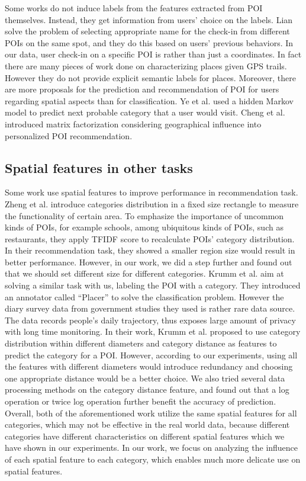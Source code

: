 Some works\cite{Kim:2011:EUF:2030112.2030142,placer1} do not induce 
labels from the features extracted from POI themselves. 
Instead, they get information from users' choice on the labels. 
Lian\cite{Lian:2011:LLN:2093973.2093990} solve the problem of 
selecting appropriate name for the check-in from 
different POIs on the same spot, and they do this based on users' previous behaviors. 
In our data, user check-in on a specific POI is rather than just a coordinates. 
In fact there are many pieces of work\cite{placer7,placer9,DBLP:journals/pvldb/CaoCJ10a,DBLP:conf/mdm/LiuWY06}
done on characterizing places given GPS trails. However they do not 
provide explicit semantic labels for places. 
Moreover, there are more proposals for the prediction and recommendation 
of POI for users regarding spatial aspects than for classification. 
Ye et al.\cite{yournextmove} used a hidden Markov model to predict  
next probable category that a user would visit. Cheng et al.\cite{cheng2012fused}
introduced matrix factorization considering geographical influence into personalized POI recommendation.

\subsection{Spatial features in other tasks}
Some work use spatial features to improve performance 
in recommendation task.
Zheng et al.\cite{LocationZheng} introduce categories distribution 
in a fixed size rectangle to measure the functionality of certain area. 
To emphasize the importance of uncommon kinds of POIs, for example schools, 
among ubiquitous kinds of POIs, such as restaurants, they apply TFIDF score to 
recalculate POIs' category distribution. In their recommendation task, 
they showed a smaller region size would result in better performance. 
However, in our work, we did a step further and found out that we should set 
different size for different categories. 
Krumm et al.\cite{LocationPlacer} aim at solving a similar task with us, 
labeling the POI with a category. They introduced an annotator called ``Placer'' to solve 
the classification problem. However the diary survey data from government studies they used
is rather rare data source. The data records people's daily trajectory, thus exposes large
amount of privacy with long time monitoring. In their work, Krumm et al. proposed to 
use category distribution within different diameters and category distance as features 
to predict the category for a POI. However, according to our experiments, 
using all the features with different diameters would introduce redundancy 
and choosing one appropriate distance would be a better choice. We also tried several 
data processing methods on the category distance feature, and found out that a log 
operation or twice log operation further benefit the accuracy of prediction. 
Overall, both of the aforementioned work utilize the same spatial features for all categories, 
which may not be effective in the real world data, because different categories have different 
characteristics on different spatial features which we have shown in our experiments. 
In our work, we focus on analyzing the influence of each spatial feature 
to each category, which enables much more delicate use on spatial features.

